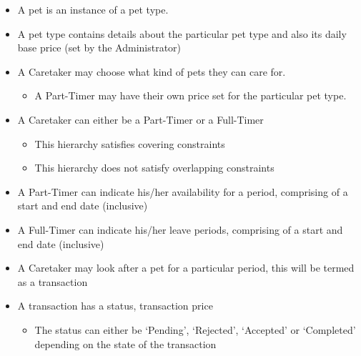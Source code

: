\documentclass[10pt]{article}
\begin{document}
\begin{itemize}
\begin{itemize}
\begin{itemize}
        \end{itemize}
        \item A pet is an instance of a pet type.
        \item A pet type contains details about the particular pet type and also its daily base price (set by the Administrator)
        \item A Caretaker may choose what kind of pets they can care for.
        \begin{itemize}
            \item A Part-Timer may have their own price set for the particular pet type.
        \end{itemize}
        \item A Caretaker can either be a Part-Timer or a Full-Timer
        \begin{itemize}
            \item This hierarchy satisfies covering constraints
            \item This hierarchy does not satisfy overlapping constraints
        \end{itemize}
        \item A Part-Timer can indicate his/her availability for a period, comprising of a start and end date (inclusive)
        \item A Full-Timer can indicate his/her leave periods, comprising of a start and end date (inclusive)
        \item A Caretaker may look after a pet for a particular period, this will be termed as a transaction 
        \item A transaction has a status, transaction price
        \begin{itemize}
            \item The status can either be `Pending', `Rejected', `Accepted' or `Completed' depending on the state of the transaction

\end{itemize}
\end{itemize}
\end{itemize}
\end{document}
